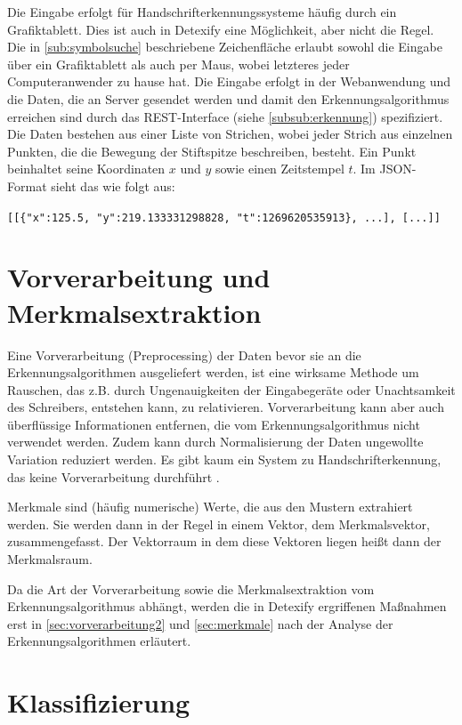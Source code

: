 Die Eingabe erfolgt für Handschrifterkennungssysteme häufig durch ein Grafiktablett. Dies ist auch in Detexify eine Möglichkeit, aber nicht die Regel. Die in \ref{sub:symbolsuche} beschriebene Zeichenfläche erlaubt sowohl die Eingabe über ein Grafiktablett als auch per Maus, wobei letzteres jeder Computeranwender zu hause hat. Die Eingabe erfolgt in der Webanwendung und die Daten, die an Server gesendet werden und damit den Erkennungsalgorithmus erreichen sind durch das \ac{REST}-Interface (siehe \ref{subsub:erkennung}) spezifiziert. Die Daten bestehen aus einer Liste von Strichen, wobei jeder Strich aus einzelnen Punkten, die die Bewegung der Stiftspitze beschreiben, besteht. Ein Punkt beinhaltet seine Koordinaten $x$ und $y$ sowie einen Zeitstempel $t$. Im \ac{JSON}-Format sieht das wie folgt aus:

\lstinline![[{"x":125.5, "y":219.133331298828, "t":1269620535913}, ...], [...]]!

\section{Vorverarbeitung und Merkmalsextraktion}
\label{sec:vorverarbeitung}

Eine Vorverarbeitung (Preprocessing) der Daten bevor sie an die Erkennungsalgorithmen ausgeliefert werden, ist eine wirksame Methode um Rauschen, das z.B. durch Ungenauigkeiten der Eingabegeräte oder Unachtsamkeit des Schreibers, entstehen kann, zu relativieren. Vorverarbeitung kann aber auch überflüssige Informationen entfernen, die vom Erkennungsalgorithmus nicht verwendet werden. Zudem kann durch Normalisierung der Daten ungewollte Variation reduziert werden. Es gibt kaum ein System zu Handschrifterkennung, das keine Vorverarbeitung durchführt \cite{Jaeger:2003p1097,Plamondon:2000p10303,Tappert:1990p10302}.

Merkmale sind (häufig numerische) Werte, die aus den Mustern extrahiert werden. Sie werden dann in der Regel in einem Vektor, dem Merkmalsvektor, zusammengefasst. Der Vektorraum in dem diese Vektoren liegen heißt dann der Merkmalsraum.

Da die Art der Vorverarbeitung sowie die Merkmalsextraktion vom Erkennungsalgorithmus abhängt, werden die in Detexify ergriffenen Maßnahmen erst in \ref{sec:vorverarbeitung2} und \ref{sec:merkmale} nach der Analyse der Erkennungsalgorithmen erläutert.


\section{Klassifizierung}

